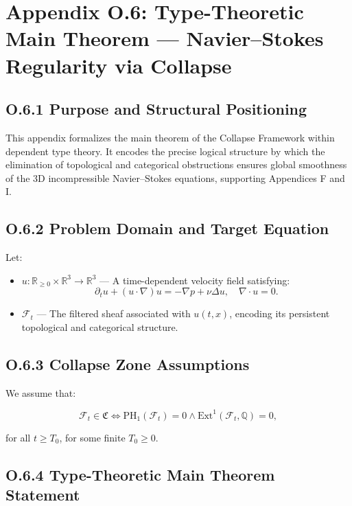 \documentclass[11pt]{article}
\begin{document}
\section*{Appendix O.6: Type-Theoretic Main Theorem — Navier–Stokes Regularity via Collapse}

\subsection*{O.6.1 Purpose and Structural Positioning}

This appendix formalizes the main theorem of the Collapse Framework within dependent type theory.  
It encodes the precise logical structure by which the elimination of topological and categorical obstructions ensures global smoothness of the 3D incompressible Navier–Stokes equations, supporting Appendices F and I.

\subsection*{O.6.2 Problem Domain and Target Equation}

Let:

\begin{itemize}
  \item \( u : \mathbb{R}_{\geq 0} \times \mathbb{R}^3 \to \mathbb{R}^3 \) — A time-dependent velocity field satisfying:
  \[
  \partial_t u + (u \cdot \nabla)u = -\nabla p + \nu \Delta u,\quad \nabla \cdot u = 0.
  \]
  \item \( \mathcal{F}_t \) — The filtered sheaf associated with \( u(t, x) \), encoding its persistent topological and categorical structure.
\end{itemize}

\subsection*{O.6.3 Collapse Zone Assumptions}

We assume that:

\[
\mathcal{F}_t \in \mathfrak{C} \iff \mathrm{PH}_1(\mathcal{F}_t) = 0 \land \mathrm{Ext}^1(\mathcal{F}_t, \mathbb{Q}) = 0,
\]

for all \( t \geq T_0 \), for some finite \( T_0 \geq 0 \).

\subsection*{O.6.4 Type-Theoretic Main Theorem Statement}
\end{document}
